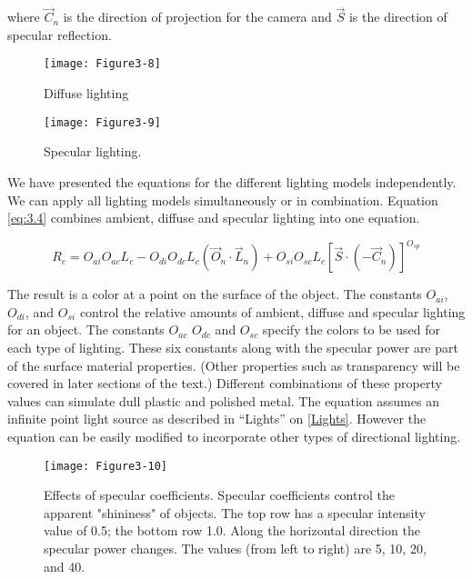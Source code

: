 where $\overrightarrow{C}_n$ is the direction of projection for the camera and $\overrightarrow{S}$ is the direction of specular reflection.

\begin{figure}[!htb]
  \centering
  \texttt{[image: Figure3-8]}\\
  \caption{Diffuse lighting}\label{fig:Figure3-8}
\end{figure}

\begin{figure}[!htb]
  \centering
  \texttt{[image: Figure3-9]}\\
  \caption{Specular lighting.}\label{fig:Figure3-9}
\end{figure}

We have presented the equations for the different lighting models independently. We can apply all lighting models simultaneously or in combination. Equation \ref{eq:3.4} combines ambient, diffuse and specular lighting into one equation.

\begin{equation}\label{eq:3.4}
  R_c = O_{ai}O_{ac}L_c - O_{di}O_{dc}L_c(\overrightarrow{O}_n \cdot \overrightarrow{L}_n) + O_{si}O_{sc}L_c[\overrightarrow{S} \cdot(-\overrightarrow{C}_n)]^{O_{sp}}
\end{equation}


The result is a color at a point on the surface of the object. The constants $O_{ai}$, $O_{di}$, and $O_{si}$ control the relative amounts of ambient, diffuse and specular lighting for an object. The constants $O_{ac}$ $O_{dc}$ and $O_{sc}$ specify the colors to be used for each type of lighting. These six constants along with the specular power are part of the surface material properties. (Other properties such as transparency will be covered in later sections of the text.) Different combinations of these property values can simulate dull plastic and polished metal. The equation assumes an infinite point light source as described in ``Lights'' on \ref{Lights}. However the equation can be easily modified to incorporate other types of directional lighting.

\begin{figure}[!htb]
  \centering
  \texttt{[image: Figure3-10]}\\
  \caption{Effects of specular coefficients. Specular coefficients control the apparent "shininess" of objects. The top row has a specular intensity value of 0.5; the bottom row 1.0. Along the horizontal direction the specular power changes. The values (from left to right) are 5, 10, 20, and 40.}\label{fig:Figure3-10}
\end{figure}

